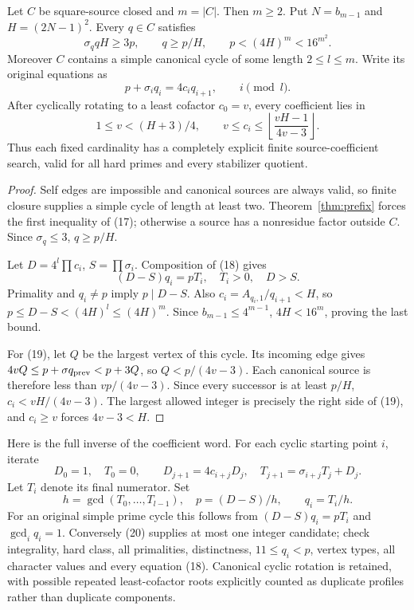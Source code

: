 \begin{theorem}
\label{thm:height}
Let $C$ be square-source closed and $m=|C|$. Then $m\ge2$. Put
$N=b_{m-1}$ and $H=(2N-1)^2$. Every $q\in C$ satisfies
\[
 \boxed{\sigma_q qH\ge3p,\qquad q\ge p/H,\qquad
 p<(4H)^m<16^{m^2}.}                                   \tag{17}
\]
Moreover $C$ contains a simple canonical cycle of some length $2\le l\le m$.
Write its original equations as
\[
 p+\sigma_iq_i=4c_iq_{i+1},\qquad i\pmod l.             \tag{18}
\]
After cyclically rotating to a least cofactor $c_0=v$, every coefficient lies in
\[
 \boxed{1\le v<(H+3)/4,\qquad
 v\le c_i\le\left\lfloor\frac{vH-1}{4v-3}\right\rfloor.}       \tag{19}
\]
Thus each fixed cardinality has a completely explicit finite source-coefficient
search, valid for all hard primes and every stabilizer quotient.
\end{theorem}
\begin{proof}
Self edges are impossible and canonical sources are always valid, so finite
closure supplies a simple cycle of length at least two. Theorem~\ref{thm:prefix}
forces the first inequality of (17); otherwise a source has a nonresidue factor
outside $C$. Since $\sigma_q\le3$, $q\ge p/H$.

Let $D=4^l\prod c_i$, $S=\prod\sigma_i$. Composition of (18) gives
\[
 (D-S)q_i=pT_i,\quad T_i>0,\quad D>S.
\]
Primality and $q_i\ne p$ imply $p\mid D-S$. Also $c_i=A_{q_i,1}/q_{i+1}<H$,
so $p\le D-S<(4H)^l\le(4H)^m$. Since $b_{m-1}\le4^{m-1}$,
$4H<16^m$, proving the last bound.

For (19), let $Q$ be the largest vertex of this cycle. Its incoming edge gives
$4vQ\le p+\sigma q_{\rm prev}<p+3Q$, so $Q<p/(4v-3)$.
Each canonical source is therefore less than $vp/(4v-3)$. Since every successor
is at least $p/H$, $c_i<vH/(4v-3)$. The largest allowed integer is precisely the
right side of (19), and $c_i\ge v$ forces $4v-3<H$.
\end{proof}

Here is the full inverse of the coefficient word. For each cyclic starting point
$i$, iterate
\[
 D_0=1,\quad T_0=0,\qquad
 D_{j+1}=4c_{i+j}D_j,\quad T_{j+1}=\sigma_{i+j}T_j+D_j.
\]
Let $T_i$ denote its final numerator. Set
\[
 h=\gcd(T_0,\ldots,T_{l-1}),\quad
 \boxed{p=(D-S)/h,\qquad q_i=T_i/h.}                    \tag{20}
\]
For an original simple prime cycle this follows from $(D-S)q_i=pT_i$ and
$\gcd_iq_i=1$. Conversely (20) supplies at most one integer candidate; check
integrality, hard class, all primalities, distinctness, $11\le q_i<p$,
vertex types, all character values and every equation (18). Canonical cyclic
rotation is retained, with possible repeated least-cofactor roots explicitly
counted as duplicate profiles rather than duplicate components.

